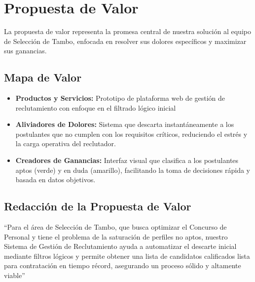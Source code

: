\chapter{Propuesta de Valor}
La propuesta de valor representa la promesa central de nuestra solución al equipo de Selección
de Tambo, enfocada en resolver sus dolores específicos y maximizar sus ganancias.

\section{Mapa de Valor}
\begin{itemize}
    \item \textbf{Productos y Servicios:} Prototipo de plataforma web de gestión de reclutamiento con enfoque en el filtrado lógico inicial
    \item \textbf{Aliviadores de Dolores:} Sistema que descarta instantáneamente a los postulantes que no cumplen con los requisitos críticos, reduciendo el estrés y la carga operativa del reclutador.
    \item \textbf{Creadores de Ganancias:} Interfaz visual que clasifica a los postulantes aptos (verde) y en duda (amarillo), facilitando la toma de decisiones rápida y basada en datos objetivos.
\end{itemize}

\section{Redacción de la Propuesta de Valor}
“Para el área de Selección de Tambo, que busca optimizar el Concurso de Personal 
y tiene el problema de la saturación de perfiles no aptos, nuestro Sistema de Gestión de Reclutamiento
ayuda a automatizar el descarte inicial mediante filtros lógicos y permite obtener una lista de candidatos 
calificados lista para contratación en tiempo récord, asegurando un proceso sólido y altamente viable”